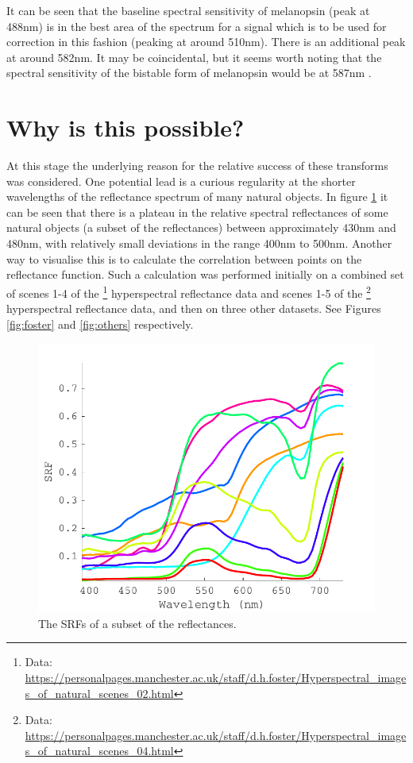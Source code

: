 It can be seen that the baseline spectral sensitivity of melanopsin (peak at 488nm) is in the best area of the spectrum for a signal which is to be used for correction in this fashion (peaking at around 510nm). There is an additional peak at around 582nm. It may be coincidental, but it seems worth noting that the spectral sensitivity of the bistable form of melanopsin would be at 587nm \citep{mure_melanopsin_2009}.



\section{Why is this possible?}


At this stage the underlying reason for the relative success of these transforms was considered. One potential lead is a curious regularity at the shorter wavelengths of the reflectance spectrum of many natural objects. In figure \ref{fig:plateau} it can be seen that there is a plateau in the relative spectral reflectances of some natural objects (a subset of the \citet{vrhel_measurement_1994} reflectances) between approximately 430nm and 480nm, with relatively small deviations in the range 400nm to 500nm. Another way to visualise this is to calculate the correlation between points on the reflectance function. Such a calculation was performed initially on a combined set of scenes 1-4 of the
\citet{nascimento_statistics_2002}\footnote{Data: \url{https://personalpages.manchester.ac.uk/staff/d.h.foster/Hyperspectral_images_of_natural_scenes_02.html}} hyperspectral reflectance data and
scenes 1-5 of the 
\citet{foster_frequency_2006}\footnote{Data: \url{https://personalpages.manchester.ac.uk/staff/d.h.foster/Hyperspectral_images_of_natural_scenes_04.html}}
hyperspectral reflectance data, and then on three other datasets. See Figures \ref{fig:foster} and \ref{fig:others} respectively.

\begin{figure}[htbp] %
 \includegraphics[max width=\textwidth]{figs/comp/plateau.pdf}
 \caption{The \glspl{SRF} of a subset of the \citet{vrhel_measurement_1994} reflectances.}
 \label{fig:plateau}
\end{figure} 

